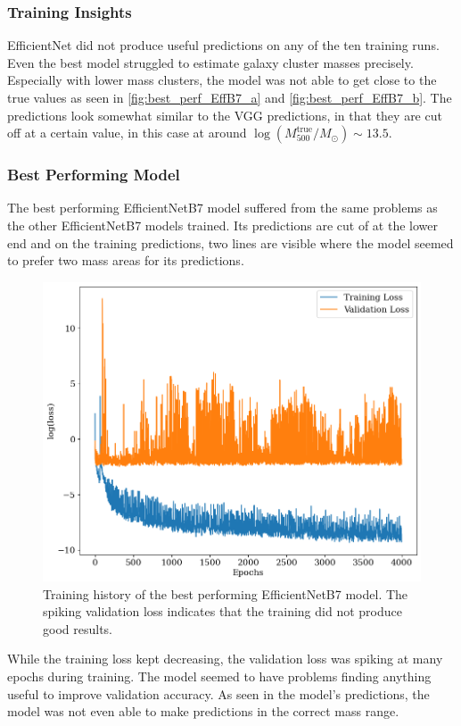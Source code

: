 \subsubsection*{Training Insights}
EfficientNet did not produce useful predictions on any of the ten training runs. Even the best model struggled to estimate galaxy cluster masses precisely. Especially with lower mass clusters, the model was not able to get close to the true values as seen in \autoref{fig:best_perf_EffB7_a} and \ref{fig:best_perf_EffB7_b}. The predictions look somewhat similar to the VGG predictions, in that they are cut off at a certain value, in this case at around $\log{(M_{500}^{\text{true}}/M_{\odot})} \sim 13.5$.

\subsubsection*{Best Performing Model}
The best performing EfficientNetB7 model suffered from the same problems as the other EfficientNetB7 models trained. Its predictions are cut of at the lower end and on the training predictions, two lines are visible where the model seemed to prefer two mass areas for its predictions.

\begin{figure}[H]
\centering
\includegraphics[width=.667\textwidth]{images/Chapter4/EffB7/eff_history.png}
\caption{Training history of the best performing EfficientNetB7 model. The spiking validation loss indicates that the training did not produce good results.} 
\label{fig:EffB7_best_history}
\end{figure}
While the training loss kept decreasing, the validation loss was spiking at many epochs during training. The model seemed to have problems finding anything useful to improve validation accuracy. As seen in the model's predictions, the model was not even able to make predictions in the correct mass range.


